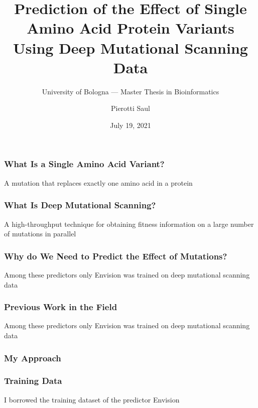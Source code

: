 \documentclass[10pt, british, luatex]{beamer}
\title[Single Amino Acid Variants Prediction]{Prediction of the Effect of Single Amino Acid Protein
	Variants\\Using Deep Mutational Scanning Data}
\subtitle[]{University of Bologna --- Master Thesis in Bioinformatics}
\author[Pierotti Saul]{Pierotti Saul}
\date{July 19, 2021}
\begin{document}
\begin{frame}[plain]
	\titlepage%
\end{frame}

\begin{frame}
	\frametitle{What Is a Single Amino Acid Variant?}
	A mutation that replaces exactly one amino acid in a protein
	\vfill%
	\begin{figure}
		
	\end{figure}
\end{frame}

\begin{frame}
	\frametitle{What Is Deep Mutational Scanning?}
	A high-throughput technique for obtaining fitness information on a large number of mutations in parallel
	\vfill%
	\begin{figure}
		
	\end{figure}
\end{frame}

\begin{frame}
	\frametitle{Why do We Need to Predict the Effect of Mutations?}
	\begin{figure}
		
	\end{figure}
	\vfill%
	Among these predictors only Envision was trained on deep mutational scanning data
\end{frame}

\begin{frame}
	\frametitle{Previous Work in the Field}
	\begin{figure}
		
	\end{figure}
	\vfill%
	Among these predictors only Envision was trained on deep mutational scanning data
\end{frame}

\begin{frame}
	\frametitle{My Approach}
	\begin{figure}
		
	\end{figure}
\end{frame}

\begin{frame}
	\frametitle{Training Data}
	I borrowed the training dataset of the predictor Envision {\footnotesize\parencite{Gray2018}}
	\vfill%
	{%
		\let\bfseries\sbseries%
		
		
	}
\end{frame}
\end{document}
